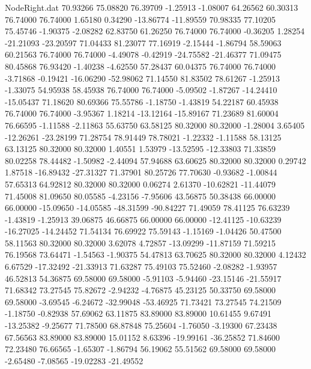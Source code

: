 \begin{filecontents}{NodeRight.dat}
  70.93266   75.08820   76.39709    -1.25913   -1.08007   64.26562   60.30313   76.74000   76.74000    1.65180    0.34290  -13.86774  -11.89559
  70.98335   77.10205   75.45746    -1.90375   -2.08282   62.83750   61.26250   76.74000   76.74000   -0.36205    1.28254  -21.21093  -23.20597
  71.04433   81.23077   77.16919    -2.15444   -1.86794   58.59063   60.21563   76.74000   76.74000   -4.49078   -0.42919  -24.75582  -21.46377
  71.09475   80.45868   76.93420    -1.40238   -4.62550   57.28437   60.04375   76.74000   76.74000   -3.71868   -0.19421  -16.06290  -52.98062
  71.14550   81.83502   78.61267    -1.25913   -1.33075   54.95938   58.45938   76.74000   76.74000   -5.09502   -1.87267  -14.24410  -15.05437
  71.18620   80.69366   75.55786    -1.18750   -1.43819   54.22187   60.45938   76.74000   76.74000   -3.95367    1.18214  -13.12164  -15.89167
  71.23689   81.60004   76.66595    -1.11588   -2.11863   55.63750   63.58125   80.32000   80.32000   -1.28004    3.65405  -12.26261  -23.28199
  71.28754   78.91449   78.78021    -1.22332   -1.11588   58.13125   63.13125   80.32000   80.32000    1.40551    1.53979  -13.52595  -12.33803
  71.33859   80.02258   78.44482    -1.50982   -2.44094   57.94688   63.60625   80.32000   80.32000    0.29742    1.87518  -16.89432  -27.31327
  71.37901   80.25726   77.70630    -0.93682   -1.00844   57.65313   64.92812   80.32000   80.32000    0.06274    2.61370  -10.62821  -11.44079
  71.45008   81.09650   80.05585    -4.23156   -7.95606   43.56875   50.38438   66.00000   66.00000  -15.09650  -14.05585  -48.31599  -90.84227
  71.49059   78.41125   76.63239    -1.43819   -1.25913   39.06875   46.66875   66.00000   66.00000  -12.41125  -10.63239  -16.27025  -14.24452
  71.54134   76.69922   75.59143    -1.15169   -1.04426   50.47500   58.11563   80.32000   80.32000    3.62078    4.72857  -13.09299  -11.87159
  71.59215   76.19568   73.64471    -1.54563   -1.90375   54.47813   63.70625   80.32000   80.32000    4.12432    6.67529  -17.32492  -21.33913
  71.63287   75.49103   75.52460    -2.08282   -1.93957   46.52813   54.36875   69.58000   69.58000   -5.91103   -5.94460  -23.15146  -21.55917
  71.68342   73.27545   75.82672    -2.94232   -4.76875   45.23125   50.33750   69.58000   69.58000   -3.69545   -6.24672  -32.99048  -53.46925
  71.73421   73.27545   74.21509    -1.18750   -0.82938   57.69062   63.11875   83.89000   83.89000   10.61455    9.67491  -13.25382   -9.25677
  71.78500   68.87848   75.25604    -1.76050   -3.19300   67.23438   67.56563   83.89000   83.89000   15.01152    8.63396  -19.99161  -36.25852
  71.84600   72.23480   76.66565    -1.65307   -1.86794   56.19062   55.51562   69.58000   69.58000   -2.65480   -7.08565  -19.02283  -21.49552

\end{filecontents}
